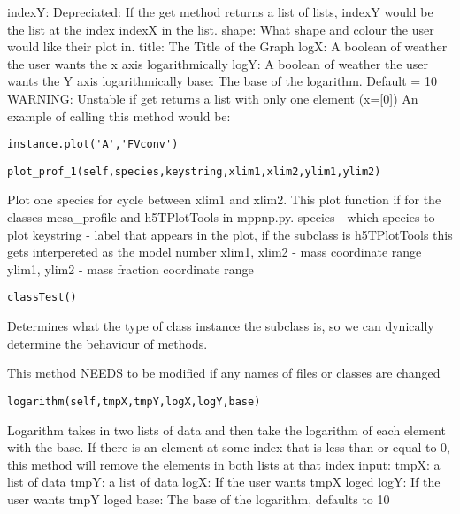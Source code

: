 		indexY: Depreciated: If the get method returns a list of lists, indexY
			would be the list at the index indexX in the list.\newline
		shape: What shape and colour the user would like their plot in.
		       \newline
		title: The Title of the Graph \newline
		logX: A boolean of weather the user wants the x axis logarithmically\newline
		logY: A boolean of weather the user wants the Y axis logarithmically\newline
		base: The base of the logarithm. Default = 10\newline
		WARNING: Unstable if get returns a list with only one element (x=[0])\newline
An example of calling this method would be:
\begin{verbatim}
instance.plot('A','FVconv')
\end{verbatim}

\begin{verbatim}
plot_prof_1(self,species,keystring,xlim1,xlim2,ylim1,ylim2)
\end{verbatim}
Plot one species for cycle between xlim1 and xlim2. This plot function if for the classes mesa\_profile and h5TPlotTools in mppnp.py.\newline		
	species      - which species to plot \newline
	keystring    - label that appears in the plot, if the subclass is h5TPlotTools this gets interpereted as the model number \newline
	xlim1, xlim2 - mass coordinate range\newline                                                 
	ylim1, ylim2 - mass fraction coordinate range\newline


\begin{verbatim}
classTest()
\end{verbatim}
Determines what the type of class instance the subclass is, so
		we can dynically determine the behaviour of methods.
		
		This method NEEDS to be modified if any names of files or classes
		are changed
\newline
\newline
\begin{verbatim}
logarithm(self,tmpX,tmpY,logX,logY,base)
\end{verbatim}
Logarithm takes in two lists of data and then take the 
		logarithm of each element with the base. If there is an
		element at some index that is less than or equal to 0, this 
		method will remove the elements in both lists at that index\newline
		input:\newline
		tmpX: a list of data\newline
		tmpY: a list of data\newline
		logX: If the user wants tmpX loged\newline
		logY: If the user wants tmpY loged\newline
		base: The base of the logarithm, defaults to 10\newline
		
